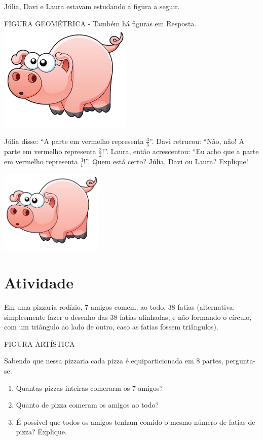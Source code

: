 \documentclass[a4,12pt]{book}
\begin{document}
Júlia, Davi e Laura estavam estudando a figura a seguir.
\begin{imagem*}[breakable]{}{}   FIGURA GEOMÉTRICA -  Também há figuras em Resposta.  
    \includegraphics[width=180pt, keepaspectratio]{pig}  
\end{imagem*}

Júlia disse: ``A parte em vermelho representa $\frac{3}{5}$''. Davi retrucou: ``Não, não! A parte em vermelho representa $\frac{3}{2}$!''. Laura, então acrescentou: ``Eu acho que a parte em vermelho representa $\frac{3}{1}$!''. Quem está certo? Júlia, Davi ou Laura? Explique!






\includegraphics[width=\textwidth,height=4cm, keepaspectratio]{pig}
\section{Atividade}






Em uma pizzaria rodízio, 7 amigos comem, ao todo, 38 fatias (alternativa: simplesmente fazer o desenho das 38 fatias alinhadas, e não formando o círculo, com um triângulo ao lado de outro, caso as fatias fossem triângulos).
\begin{imagem*}[breakable]{}{}   FIGURA ARTÍSTICA  
\end{imagem*}

Sabendo que nessa pizzaria cada pizza é equiparticionada em 8 partes, pergunta-se: 
\begin{enumerate} [\quad a)] %
  \item     Quantas pizzas inteiras comerarm os 7 amigos? 
  \item     Quanto de pizza comeram os amigos ao todo? 
  \item     É possível que todos os amigos tenham comido o mesmo número de fatias de pizza? Explique.
\end{enumerate} %
\end{document}
